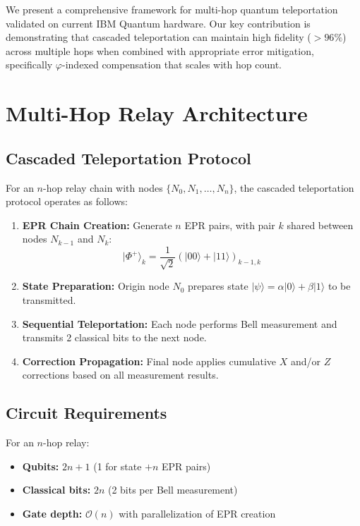 \documentclass[twocolumn,preprintnumbers,amsmath,amssymb,prl]{revtex4-2}
\begin{document}
We present a comprehensive framework for multi-hop quantum teleportation validated on current IBM Quantum hardware. Our key contribution is demonstrating that cascaded teleportation can maintain high fidelity ($>96\%$) across multiple hops when combined with appropriate error mitigation, specifically $\varphi$-indexed compensation that scales with hop count.

\section{Multi-Hop Relay Architecture}

\subsection{Cascaded Teleportation Protocol}

For an $n$-hop relay chain with nodes $\{N_0, N_1, \ldots, N_n\}$, the cascaded teleportation protocol operates as follows:

\begin{enumerate}
\item \textbf{EPR Chain Creation:} Generate $n$ EPR pairs, with pair $k$ shared between nodes $N_{k-1}$ and $N_k$:
\begin{equation}
|\Phi^+\rangle_k = \frac{1}{\sqrt{2}}(|00\rangle + |11\rangle)_{k-1,k}
\end{equation}

\item \textbf{State Preparation:} Origin node $N_0$ prepares state $|\psi\rangle = \alpha|0\rangle + \beta|1\rangle$ to be transmitted.

\item \textbf{Sequential Teleportation:} Each node performs Bell measurement and transmits 2 classical bits to the next node.

\item \textbf{Correction Propagation:} Final node applies cumulative $X$ and/or $Z$ corrections based on all measurement results.
\end{enumerate}

\subsection{Circuit Requirements}

For an $n$-hop relay:
\begin{itemize}
\item \textbf{Qubits:} $2n + 1$ (1 for state $+ n$ EPR pairs)
\item \textbf{Classical bits:} $2n$ (2 bits per Bell measurement)
\item \textbf{Gate depth:} $\mathcal{O}(n)$ with parallelization of EPR creation
\end{itemize}
\end{document}
